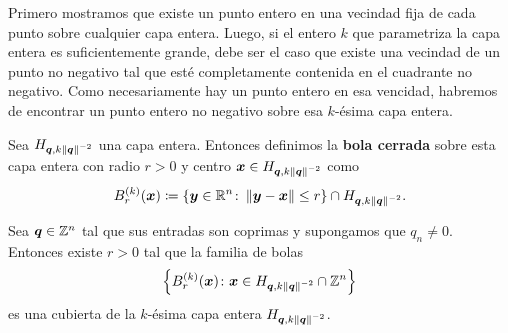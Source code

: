 Primero mostramos que existe un punto entero en una vecindad fija de cada punto sobre cualquier capa
entera. Luego, si el entero $k$ que parametriza la capa entera es suficientemente grande, debe ser
el caso que existe una vecindad de un punto no negativo tal que esté completamente contenida en el
cuadrante no negativo. Como necesariamente hay un punto entero en esa vencidad, habremos de
encontrar un punto entero no negativo sobre esa $k$-ésima capa entera.

\begin{definition}
	\label{fin:def:ball}
	Sea $H_{\boldsymbol{q}, k\left\lVert \boldsymbol{q} \right\rVert^{-2}}$ una capa entera. Entonces definimos la \textbf{bola
	cerrada} sobre
	esta capa entera con radio $r > 0$ y centro $\boldsymbol{x} \in H_{\boldsymbol{q}, k\left\lVert \boldsymbol{q} \right\rVert^{-2}}$ como
	\begin{equation}
		\label{eq:k-ball}
		B_r^{(k)}(\boldsymbol{x}) \coloneq \lbrace \boldsymbol{y} \in \mathbb{R}^n \colon \left\lVert \boldsymbol{y} - \boldsymbol{x} \right\rVert \leq r
		\rbrace \cap H_{\boldsymbol{q}, k \left\lVert \boldsymbol{q} \right\rVert^{-2}}.
	\end{equation}
\end{definition}
\begin{theorem}
	\label{lemma:ball-cover}
	Sea $\boldsymbol{q} \in \mathbb{Z}^n$ tal que sus entradas son coprimas y supongamos que $q_n \neq 0$. Entonces
	existe $r > 0$ tal que la familia de bolas
	\begin{equation*}
		\left\lbrace B_r^{(k)}(\boldsymbol{x}) \colon \boldsymbol{x} \in H_{\boldsymbol{q}, k\left\lVert \boldsymbol{q} \right\rVert^{-2}} \cap
			\mathbb{Z}^n \right\rbrace
	\end{equation*}
	es una cubierta de la $k$-ésima capa entera $H_{\boldsymbol{q}, k\left\lVert \boldsymbol{q} \right\rVert^{-2}}$.
\end{theorem}
